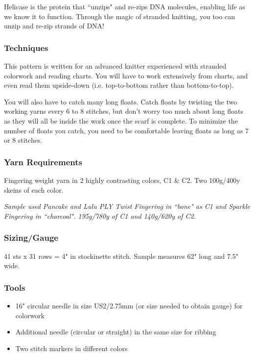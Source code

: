 \documentclass[12pt]{article}
\begin{document}
\small
\begin{multicols}{2}
Helicase is the protein that ``unzips" and re-zips DNA molecules, enabling life as we know it to function. Through the magic of stranded knitting, you too can unzip and re-zip strands of DNA!

\subsubsection*{Techniques}

This pattern is written for an advanced knitter experienced with stranded colorwork and reading charts. You will have to work extensively from charts, and even read them upside-down (i.e. top-to-bottom rather than bottom-to-top). 

\vspace{1em}
You will also have to catch many long floats. Catch floats by twisting the two working yarns every 6 to 8 stitches, but don't worry too much about long floats as they will all be inside the work once the scarf is complete. To minimize the number of floats you catch, you need to be comfortable leaving floats as long as 7 or 8 stitches.

\vfill
\columnbreak

\subsubsection*{Yarn Requirements}

Fingering weight yarn in 2 highly contrasting colors, C1 \& C2. Two 100g/400y skeins of each color. 

\vspace{1em}
\emph{Sample used Pancake and Lulu PLY Twist Fingering in ``bone" as C1 and Sparkle Fingering in ``charcoal". 195g/780y of C1 and 140g/620y of C2.}

\subsubsection*{Sizing/Gauge}
41 sts x 31 rows = 4" in stockinette stitch. Sample measures 62" long and 7.5" wide.

\subsubsection*{Tools}
\begin{itemize}
\item 16" circular needle in size US2/2.75mm (or size needed to obtain gauge) for colorwork
\item Additional needle (circular or straight) in the same size for ribbing
\item Two stitch markers in different colors
\end{itemize}

\end{multicols}
\end{document}
